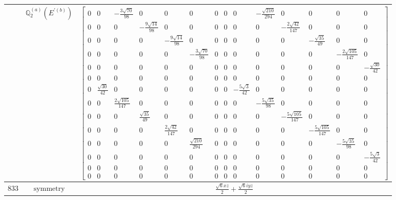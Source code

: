 \documentclass[fleqn,8pt,landscape]{jsarticle}
\begin{document}
\begin{longtable}{ccc}
$  $ & $ \mathbb{Q}_{2}^{(a)}(E^{\prime(b)}) $ & $ \begin{bmatrix} 0 & 0 & - \frac{3 \sqrt{70}}{98} & 0 & 0 & 0 & 0 & 0 & 0 & - \frac{\sqrt{210}}{294} & 0 & 0 & 0 & 0 \\ 0 & 0 & 0 & - \frac{9 \sqrt{14}}{98} & 0 & 0 & 0 & 0 & 0 & 0 & - \frac{2 \sqrt{42}}{147} & 0 & 0 & 0 \\ 0 & 0 & 0 & 0 & - \frac{9 \sqrt{14}}{98} & 0 & 0 & 0 & 0 & 0 & 0 & - \frac{\sqrt{35}}{49} & 0 & 0 \\ 0 & 0 & 0 & 0 & 0 & - \frac{3 \sqrt{70}}{98} & 0 & 0 & 0 & 0 & 0 & 0 & - \frac{2 \sqrt{105}}{147} & 0 \\ 0 & 0 & 0 & 0 & 0 & 0 & 0 & 0 & 0 & 0 & 0 & 0 & 0 & - \frac{\sqrt{30}}{42} \\ 0 & 0 & 0 & 0 & 0 & 0 & 0 & 0 & 0 & 0 & 0 & 0 & 0 & 0 \\ 0 & \frac{\sqrt{30}}{42} & 0 & 0 & 0 & 0 & 0 & 0 & - \frac{5 \sqrt{3}}{42} & 0 & 0 & 0 & 0 & 0 \\ 0 & 0 & \frac{2 \sqrt{105}}{147} & 0 & 0 & 0 & 0 & 0 & 0 & - \frac{5 \sqrt{35}}{98} & 0 & 0 & 0 & 0 \\ 0 & 0 & 0 & \frac{\sqrt{35}}{49} & 0 & 0 & 0 & 0 & 0 & 0 & - \frac{5 \sqrt{105}}{147} & 0 & 0 & 0 \\ 0 & 0 & 0 & 0 & \frac{2 \sqrt{42}}{147} & 0 & 0 & 0 & 0 & 0 & 0 & - \frac{5 \sqrt{105}}{147} & 0 & 0 \\ 0 & 0 & 0 & 0 & 0 & \frac{\sqrt{210}}{294} & 0 & 0 & 0 & 0 & 0 & 0 & - \frac{5 \sqrt{35}}{98} & 0 \\ 0 & 0 & 0 & 0 & 0 & 0 & 0 & 0 & 0 & 0 & 0 & 0 & 0 & - \frac{5 \sqrt{3}}{42} \\ 0 & 0 & 0 & 0 & 0 & 0 & 0 & 0 & 0 & 0 & 0 & 0 & 0 & 0 \\ 0 & 0 & 0 & 0 & 0 & 0 & 0 & 0 & 0 & 0 & 0 & 0 & 0 & 0 \end{bmatrix} $ \\ \hline
$ 833 $ & $ \text{symmetry} $ & $ \frac{\sqrt{6} x z}{2} + \frac{\sqrt{6} i y z}{2} $ \\

\end{longtable}
\end{document}
